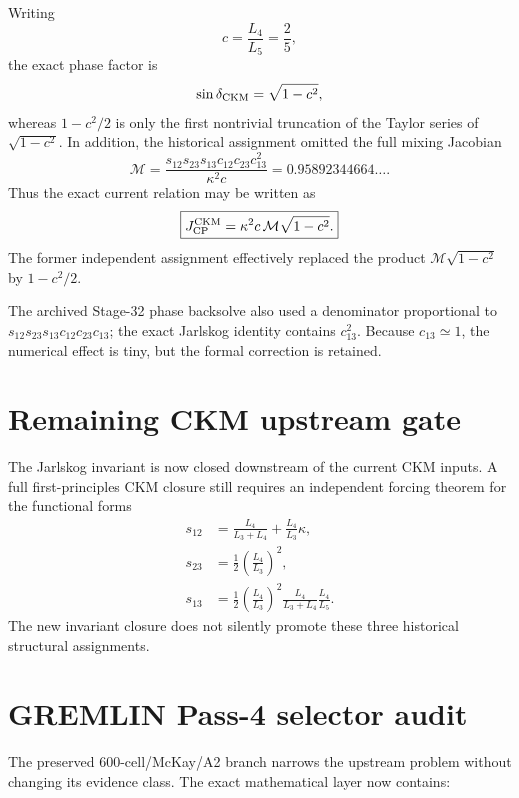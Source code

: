 \documentclass[11pt,a4paper,twoside]{book}
\theoremstyle{definition}
\begin{document}
Writing
\[
c=\frac{L_4}{L_5}=\frac25,
\]
the exact phase factor is
\[
\sin\delta_{\rm CKM}=\sqrt{1-c^2},
\]
whereas $1-c^2/2$ is only the first nontrivial truncation of the Taylor series
of $\sqrt{1-c^2}$.  In addition, the historical assignment omitted the full
mixing Jacobian
\begin{equation}
\mathcal M
=\frac{s_{12}s_{23}s_{13}c_{12}c_{23}c_{13}^2}{\kappa^2c}
=0.95892344664\ldots .
\label{eq:v12-ckm-mixing-jacobian}
\end{equation}
Thus the exact current relation may be written as
\begin{equation}
\boxed{
J_{\rm CP}^{\rm CKM}
=\kappa^2c\,\mathcal M\sqrt{1-c^2}.
}
\label{eq:v12-ckm-j-factorized}
\end{equation}
The former independent assignment effectively replaced the product
$\mathcal M\sqrt{1-c^2}$ by $1-c^2/2$.

The archived Stage-32 phase backsolve also used a denominator proportional to
$s_{12}s_{23}s_{13}c_{12}c_{23}c_{13}$; the exact Jarlskog identity contains
$c_{13}^2$.  Because $c_{13}\simeq1$, the numerical effect is tiny, but the
formal correction is retained.

\section{Remaining CKM upstream gate}
The Jarlskog invariant is now closed downstream of the current CKM inputs.  A
full first-principles CKM closure still requires an independent forcing theorem
for the functional forms
\begin{equation}
\boxed{
\begin{aligned}
s_{12}
&=\frac{L_4}{L_3+L_4}+\frac{L_4}{L_3}\kappa,\\
s_{23}
&=\frac12\left(\frac{L_4}{L_3}\right)^2,\\
s_{13}
&=\frac12\left(\frac{L_4}{L_3}\right)^2
\frac{L_4}{L_3+L_4}\frac{L_4}{L_5}.
\end{aligned}
}
\label{eq:v12-ckm-upstream-open}
\end{equation}
The new invariant closure does not silently promote these three historical
structural assignments.

\section{GREMLIN Pass-4 selector audit}

The preserved 600-cell/McKay/A2 branch narrows the upstream problem without
changing its evidence class.  The exact mathematical layer now contains:
\end{document}
